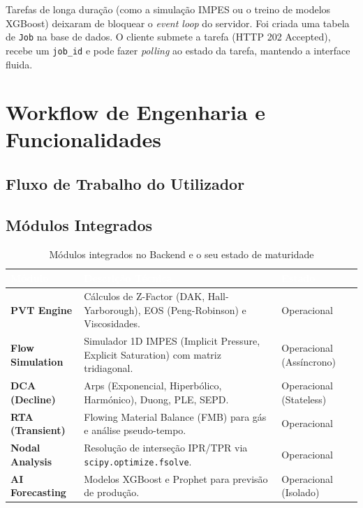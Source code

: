\documentclass[12pt,a4paper]{article}
\begin{document}
Tarefas de longa duração (como a simulação IMPES ou o treino de modelos XGBoost) deixaram de bloquear o \textit{event loop} do servidor. Foi criada uma tabela de \texttt{Job} na base de dados. O cliente submete a tarefa (HTTP 202 Accepted), recebe um \texttt{job\_id} e pode fazer \textit{polling} ao estado da tarefa, mantendo a interface fluida.

\section{Workflow de Engenharia e Funcionalidades}

\subsection{Fluxo de Trabalho do Utilizador}

\begin{center}
\end{center}

\subsection{Módulos Integrados}

\begin{table}[H]
\centering\small
\begin{tabularx}{\textwidth}{>{\bfseries}p{2.5cm} X X}
\toprule
\rowcolor{tableheader}
\textcolor{white}{\textbf{Módulo}} & \textcolor{white}{\textbf{Descrição Técnica}} & \textcolor{white}{\textbf{Estado}} \\
\midrule
PVT Engine & Cálculos de Z-Factor (DAK, Hall-Yarborough), EOS (Peng-Robinson) e Viscosidades. & Operacional\\
Flow Simulation & Simulador 1D IMPES (Implicit Pressure, Explicit Saturation) com matriz tridiagonal. & Operacional (Assíncrono)\\
DCA (Decline) & Arps (Exponencial, Hiperbólico, Harmónico), Duong, PLE, SEPD. & Operacional (Stateless)\\
RTA (Transient) & Flowing Material Balance (FMB) para gás e análise pseudo-tempo. & Operacional\\
Nodal Analysis & Resolução de interseção IPR/TPR via \texttt{scipy.optimize.fsolve}. & Operacional\\
AI Forecasting & Modelos XGBoost e Prophet para previsão de produção. & Operacional (Isolado)\\
\bottomrule
\end{tabularx}
\caption{Módulos integrados no Backend e o seu estado de maturidade}
\end{table}
\end{document}
